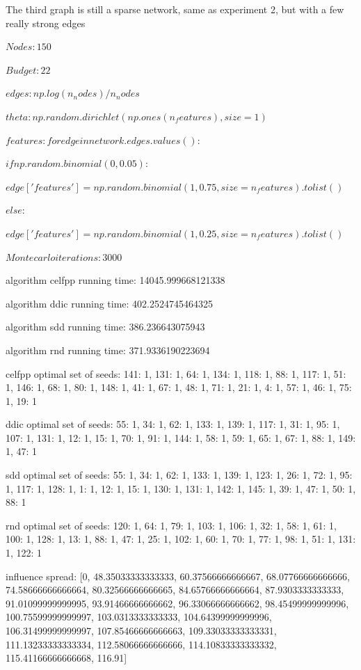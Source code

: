 The third graph is still a sparse network, same as experiment 2, but with a few really strong edges

$Nodes: 150$

$Budget: 22$

$edges: np.log(n_nodes) / n_nodes$

$theta: np.random.dirichlet(np.ones(n_features), size=1)$

$features: for edge in network.edges.values():$

$if np.random.binomial(0, 0.05):$

$edge['features'] = np.random.binomial(1, 0.75, size=n_features).tolist()$

$else:$

$edge['features'] = np.random.binomial(1, 0.25, size=n_features).tolist()$

$Montecarlo iterations: 3000$

algorithm celfpp running time: 14045.999668121338

algorithm ddic running time: 402.2524745464325

algorithm sdd running time: 386.236643075943

algorithm rnd running time: 371.9336190223694

celfpp optimal set of seeds: {141: 1, 131: 1, 64: 1, 134: 1, 118: 1, 88: 1, 117: 1, 51: 1, 146: 1, 68: 1, 80: 1, 148: 1, 41: 1, 67: 1, 48: 1, 71: 1, 21: 1, 4: 1, 57: 1, 46: 1, 75: 1, 19: 1}

ddic optimal set of seeds: {55: 1, 34: 1, 62: 1, 133: 1, 139: 1, 117: 1, 31: 1, 95: 1, 107: 1, 131: 1, 12: 1, 15: 1, 70: 1, 91: 1, 144: 1, 58: 1, 59: 1, 65: 1, 67: 1, 88: 1, 149: 1, 47: 1}

sdd optimal set of seeds: {55: 1, 34: 1, 62: 1, 133: 1, 139: 1, 123: 1, 26: 1, 72: 1, 95: 1, 117: 1, 128: 1, 1: 1, 12: 1, 15: 1, 130: 1, 131: 1, 142: 1, 145: 1, 39: 1, 47: 1, 50: 1, 88: 1}

rnd optimal set of seeds: {120: 1, 64: 1, 79: 1, 103: 1, 106: 1, 32: 1, 58: 1, 61: 1, 100: 1, 128: 1, 13: 1, 88: 1, 47: 1, 25: 1, 102: 1, 60: 1, 70: 1, 77: 1, 98: 1, 51: 1, 131: 1, 122: 1}

influence spread: [0, 48.35033333333333, 60.37566666666667, 68.07766666666666, 74.58666666666664, 80.32566666666665, 84.65766666666664, 87.9303333333333, 91.01099999999995, 93.91466666666662, 96.33066666666662, 98.45499999999996, 100.75599999999997, 103.0313333333333, 104.64399999999996, 106.31499999999997, 107.85466666666663, 109.33033333333331, 111.13233333333334, 112.58066666666666, 114.10833333333332, 115.41166666666668, 116.91]

